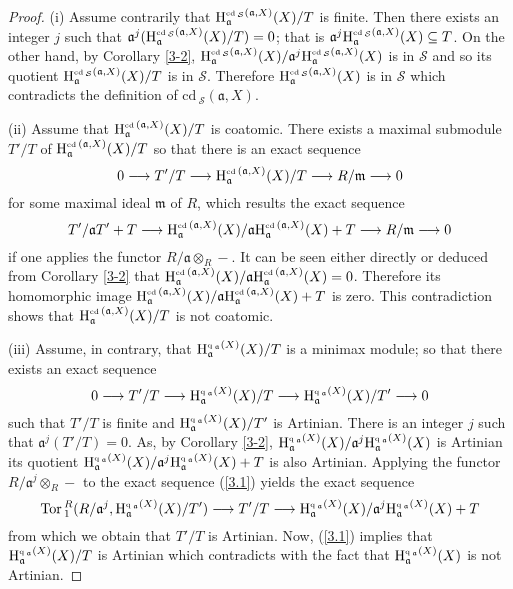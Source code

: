 \documentclass[10pt]{amsart}
\newcommand{\Tor}{\mbox{Tor}\,}
\newcommand{\cd}{\mbox{cd}\,}
\newcommand{\q}{\mbox{q}\,}
\renewcommand{\H}{\mbox{H}}
\newcommand{\lo}{\longrightarrow}
\newcommand{\fa}{\mathfrak{a}}
\newcommand{\fm}{\mathfrak{m}}
\begin{document}
\begin{proof} (i) Assume contrarily that $\H^{\tiny\cd_{\mathcal{S}}(\fa, X)}_{\fa}(X)/T$ is
finite. Then there exists an integer $j$ such that $\fa
^{j}(\H^{\tiny\cd_{\mathcal{S}}(\fa, X)}_{\fa}(X)/T)= 0$; that is
$\fa^j\H^{\tiny\cd_{\mathcal{S}}(\fa, X)}_{\fa}(X)\subseteq T$.
On the other hand, by Corollary \ref{3-2}, $\H^{\tiny\cd_{\mathcal{S}}(\fa,
X)}_{\fa}(X)/\fa ^{j}\H^{\tiny\cd_{\mathcal{S}}(\fa, X)}_{\fa}(X)$
is in $\mathcal{S}$ and so its quotient $\H^{\tiny\cd_{\mathcal{S}}(\fa,
X)}_{\fa}(X)/T$ is in $\mathcal{S}$. Therefore
$\H^{\tiny\cd_{\mathcal{S}}(\fa, X)}_{\fa}(X)$ is in $\mathcal{S}$
which contradicts the definition of $\cd_{\mathcal{S}}(\fa, X).$

(ii) Assume that $\H^{\tiny\cd(\fa, X)}_{\fa}(X)/T$ is coatomic.
There exists a maximal submodule $T'/T$ of $\H^{\tiny\cd(\fa, X)}_{\fa}(X)/T$
so that there is an exact sequence
$$0\lo T'/T\lo \H^{\tiny\cd(\fa, X)}_{\fa}(X)/T\lo R/\fm\lo 0$$
for some maximal ideal $\fm$ of $R$, which results the exact
sequence
$$T'/\fa T'+ T\lo \H^{\tiny\cd(\fa, X)}_{\fa}(X)/\fa \H^{\tiny\cd(\fa, X)}_{\fa}(X)+T\lo R/\fm\lo 0$$
if one applies the functor $R/\fa\otimes_R -$. It can be seen either
directly or deduced from Corollary \ref{3-2} that $\H^{\tiny\cd(\fa,
X)}_{\fa}(X)/\fa \H^{\tiny\cd(\fa, X)}_{\fa}(X)= 0$. Therefore its
homomorphic image $\H^{\tiny\cd(\fa, X)}_{\fa}(X)/\fa
\H^{\tiny\cd(\fa, X)}_{\fa}(X)+ T$ is zero. This contradiction shows
that $\H^{\tiny\cd(\fa, X)}_{\fa}(X)/T$ is not coatomic.

(iii) Assume, in contrary, that $\H_{\fa}^{\tiny\q_{\fa}(X)}(X)/T$
is a minimax module; so that there exists an exact sequence
\begin{equation}\label{3.1}
0\lo T'/T\lo \H_{\fa}^{\tiny\q_\fa(X)}(X)/T\lo
\H_{\fa}^{\tiny\q_{\fa}(X)}(X)/T'\lo 0
\end{equation}
such that $T'/T$ is finite and $\H_{\fa}^{\tiny\q_{\fa}(X)}(X)/T'$
is Artinian. There is an integer $j$ such that $\fa^{j}(T'/T)= 0$.
As, by Corollary \ref {3-2}, $\H_{\fa}^{\tiny\q_{\fa}(X)}(X)/\fa^{j}
\H_{\fa}^{\tiny\q_{\fa}(X)}(X)$ is Artinian its quotient
$\H_{\fa}^{\tiny\q_{\fa}(X)}(X)/\fa^{j}
\H_{\fa}^{\tiny\q_{\fa}(X)}(X)+ T$ is also Artinian. Applying the
functor $R/\fa^j\otimes_R -$ to the exact sequence (\ref {3.1})
yields the exact sequence
$$\Tor^R_1(R/\fa^j, \H_{\fa}^{\tiny\q_{\fa}(X)}(X)/T') \lo T'/T\lo
\H_{\fa}^{\tiny\q_{\fa}(X)}(X)/\fa^j \H_{\fa}^{\tiny\q_{\fa}(X)}(X)+
T$$ from which we obtain that $T'/T$ is Artinian. Now, (\ref {3.1})
implies that $\H_{\fa}^{\tiny\q_{\fa}(X)}(X)/T$ is Artinian which
contradicts with the fact that $\H_{\fa}^{\tiny\q_{\fa}(X)}(X)$ is
not Artinian.
\end{proof}
\end{document}
